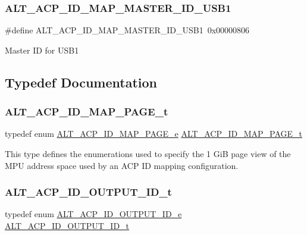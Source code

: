 \subsubsection{\texorpdfstring{ALT\_ACP\_ID\_MAP\_MASTER\_ID\_USB1}{ALT\_ACP\_ID\_MAP\_MASTER\_ID\_USB1}}
{\footnotesize\ttfamily \#define A\+L\+T\+\_\+\+A\+C\+P\+\_\+\+I\+D\+\_\+\+M\+A\+P\+\_\+\+M\+A\+S\+T\+E\+R\+\_\+\+I\+D\+\_\+\+U\+S\+B1~0x00000806}

Master ID for U\+S\+B1 

\subsection{Typedef Documentation}
\mbox{\label{group__ADDR__SPACE__MGR__MEM__COHERENCE_ga76f004ab7bdcd5ccff68cf02fb9e5f5d}} 
\subsubsection{\texorpdfstring{ALT\_ACP\_ID\_MAP\_PAGE\_t}{ALT\_ACP\_ID\_MAP\_PAGE\_t}}
{\footnotesize\ttfamily typedef enum \mbox{\hyperlink{group__ADDR__SPACE__MGR__MEM__COHERENCE_gadd781c359099569d3053f323121d3dd0}{A\+L\+T\+\_\+\+A\+C\+P\+\_\+\+I\+D\+\_\+\+M\+A\+P\+\_\+\+P\+A\+G\+E\+\_\+e}}  \mbox{\hyperlink{group__ADDR__SPACE__MGR__MEM__COHERENCE_ga76f004ab7bdcd5ccff68cf02fb9e5f5d}{A\+L\+T\+\_\+\+A\+C\+P\+\_\+\+I\+D\+\_\+\+M\+A\+P\+\_\+\+P\+A\+G\+E\+\_\+t}}}

This type defines the enumerations used to specify the 1 GiB page view of the M\+PU address space used by an A\+CP ID mapping configuration. \mbox{\label{group__ADDR__SPACE__MGR__MEM__COHERENCE_gac7e726302b3a38141a36cf97a4ef4f89}} 
\subsubsection{\texorpdfstring{ALT\_ACP\_ID\_OUTPUT\_ID\_t}{ALT\_ACP\_ID\_OUTPUT\_ID\_t}}
{\footnotesize\ttfamily typedef enum \mbox{\hyperlink{group__ADDR__SPACE__MGR__MEM__COHERENCE_ga4f1a98efabe5d8fcfcddf0e2da731d0a}{A\+L\+T\+\_\+\+A\+C\+P\+\_\+\+I\+D\+\_\+\+O\+U\+T\+P\+U\+T\+\_\+\+I\+D\+\_\+e}}  \mbox{\hyperlink{group__ADDR__SPACE__MGR__MEM__COHERENCE_gac7e726302b3a38141a36cf97a4ef4f89}{A\+L\+T\+\_\+\+A\+C\+P\+\_\+\+I\+D\+\_\+\+O\+U\+T\+P\+U\+T\+\_\+\+I\+D\+\_\+t}}}

